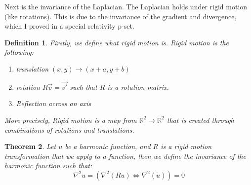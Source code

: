 \documentclass{article}
\newtheorem{theorem}{Theorem}[section]
\newtheorem{definition}[theorem]{Definition}
\begin{document}
Next is the invariance of the Laplacian. The Laplacian holds under rigid motion (like rotations). This is due to the invariance of the gradient and divergence, which I proved in a special relativity p-set.

\begin{definition}
    Firstly, we define what rigid motion is. Rigid motion is the following:
    \begin{enumerate}
        \item translation $(x,y) \rightarrow (x + a, y + b)$
        \item rotation $R\vec{v} = \vec{v'}$ such that $R$ is a rotation matrix. 
        \item Reflection across an axis
    \end{enumerate}
    More precisely, Rigid motion is a map from $\mathbb{R}^2 \rightarrow \mathbb{R}^2$ that is created through combinations of rotations and translations. 
\end{definition}

\begin{theorem}
    Let $u$ be a harmonic function, and $R$ is a rigid motion transformation that we apply to a function, then we define the invariance of the harmonic function such that:
    \begin{equation}
        \nabla^2u = (\nabla^2(Ru) \iff \nabla^2(\tilde{u})) = 0
    \end{equation}
\end{theorem}
\end{document}
